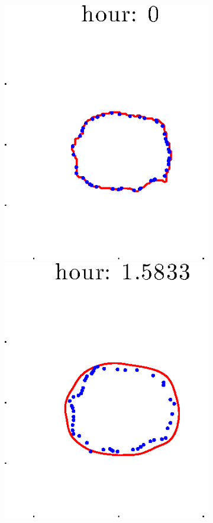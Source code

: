 \documentclass[12pt]{article}
\begin{document}
\begin{figure}[h!]
\centering
	\begin{subfigure}[b]{.3\textwidth}
	\centering
		\includegraphics[height=.15\textheight]{Pos10exp2/full/full1.eps}
		\includegraphics[height=.15\textheight]{Pos10exp2/full/full2.eps}

\end{subfigure}
\end{figure}
\end{document}

